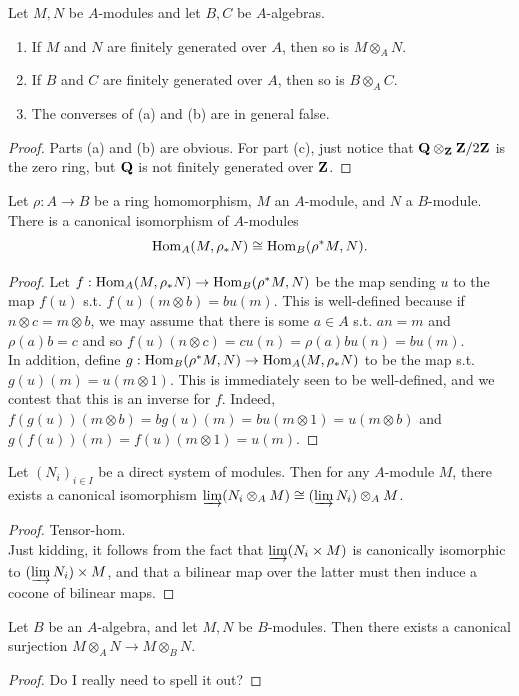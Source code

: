 \begin{exer}
	Let $M,N$ be $A$-modules and let $B,C$ be $A$-algebras.
	\begin{enumerate}[label=(\alph*)]
		\item If $M$ and $N$ are finitely generated over $A$, then so is
			$M \otimes_A N$.
		\item If $B$ and $C$ are finitely generated over $A$, then so is
			$B \otimes_A C$.
		\item The converses of (a) and (b) are in general false.
	\end{enumerate}
\end{exer}
\begin{proof}
	Parts (a) and (b) are obvious. For part (c), just notice that
	$\mathbf{Q} \otimes_{\mathbf{Z}} \mathbf{Z}/2\mathbf{Z}$ is the zero ring,
	but $\mathbf{Q}$ is not finitely generated over $\mathbf{Z}$.
\end{proof}

\begin{exer}
	Let $\rho: A \to B$ be a ring homomorphism, $M$ an $A$-module, and $N$
	a $B$-module. There is a canonical isomorphism of $A$-modules
	\[
		\operatorname{Hom}_A(M,\rho_*N) \cong \operatorname{Hom}_B(\rho^*M,N).
	\]
\end{exer}
\begin{proof}
	Let $f: \operatorname{Hom}_A(M,\rho_*N) \to \operatorname{Hom}_B(\rho^*M,N)$ be the map sending $u$
	to the map $f(u)$ s.t. $f(u)(m \otimes b) = bu(m)$. This is well-defined
	because if $n \otimes c = m \otimes b$, we may assume that there is some
	$a\in A$ s.t. $an = m$ and $\rho(a)b = c$ and so 
	$f(u)(n \otimes c) = cu(n) = \rho(a)bu(n) = bu(m)$.\\

	In addition, define
	$g: \operatorname{Hom}_B(\rho^*M,N) \to \operatorname{Hom}_A(M,\rho_*N)$ to be the map s.t.
	$g(u)(m) = u(m \otimes 1)$. This is immediately seen to be well-defined,
	and we contest that this is an inverse for $f$. Indeed, 
	$f(g(u))(m \otimes b) = bg(u)(m) = bu(m \otimes 1) = u(m \otimes b)$ and
	$g(f(u))(m) = f(u)(m \otimes 1) = u(m)$.
\end{proof}

\begin{exer}
	Let $(N_i)_{i\in I}$ be a direct system of modules. Then for any
	$A$-module $M$, there exists a canonical isomorphism
	$\varinjlim (N_i \otimes_A M) \cong (\varinjlim N_i) \otimes_A M$.
\end{exer}
\begin{proof}
	Tensor-hom.\\

	Just kidding, it follows from the fact that $\varinjlim (N_i \times M)$
	is canonically isomorphic to $(\varinjlim N_i) \times M$, and that a
	bilinear map over the latter must then induce a cocone of bilinear maps.
\end{proof}

\begin{exer}
	Let $B$ be an $A$-algebra, and let $M,N$ be $B$-modules. Then there
	exists a canonical surjection $M \otimes_A N \to M \otimes_B N$.
\end{exer}
\begin{proof}
	Do I really need to spell it out?
\end{proof}
